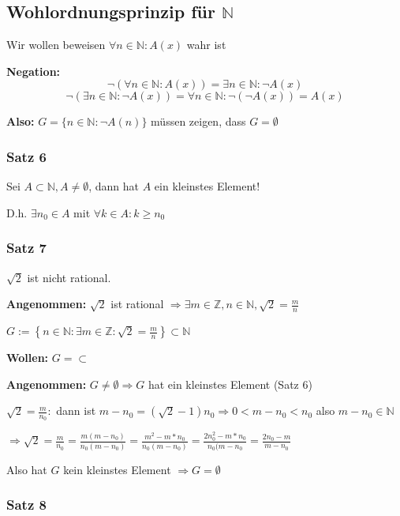 \documentclass[fleqn]{scrartcl}
\begin{document}
\subsection{Wohlordnungsprinzip für $\mathbb{N}$}

Wir wollen beweisen $\forall n \in \mathbb{N}: A(x)$ wahr ist

\textbf{Negation:}
\[\lnot(\forall n \in \mathbb{N}: A(x))=\exists n \in \mathbb{N}: \lnot A(x)\]
\[\lnot(\exists n \in \mathbb{N}: \lnot A(x))=\forall n \in \mathbb{N}: \lnot(\lnot A(x)) = A(x)\]

\textbf{Also:} $G=\{n\in \mathbb{N}: \lnot A(n)\}$ müssen zeigen, dass $G=\emptyset$

\subsubsection{Satz 6}

Sei $A \subset \mathbb{N}, A \neq \emptyset$, dann hat $A$ ein kleinstes Element!

D.h. $\exists n_0 \in A$ mit $\forall k \in A: k \geq n_0$

\subsubsection{Satz 7}

$\sqrt{2}$ ist nicht rational.

\textbf{Angenommen:} $\sqrt{2}$ ist rational $\Longrightarrow \exists m \in \mathbb{Z}, n \in \mathbb{N}, \sqrt{2}=\frac{m}{n}$

$G:=\left\{ n \in \mathbb{N}: \exists m \in \mathbb{Z}: \sqrt{2} = \frac{m}{n} \right\} \subset \mathbb{N}$

\textbf{Wollen:} $G=\subset$

\textbf{Angenommen:} $G \neq \emptyset \Longrightarrow G$ hat ein kleinstes Element (Satz 6)

$\sqrt{2}=\frac{m}{n_0}:$ dann ist $m-n_0 = (\sqrt{2}-1)n_0 \Longrightarrow 0<m-n_0<n_0$ also $m-n_0 \in \mathbb{N}$

$\Longrightarrow \sqrt{2} = \frac{m}{n_0} = \frac{m(m-n_0)}{n_0(m-n_0)} = \frac{m^2-m*n_0}{n_0(m-n_0)} = \frac{2n_0^2-m*n_0}{n_0(m-n_0} = \frac{2n_0-m}{m-n_0}$

Also hat $G$ kein kleinstes Element $\Longrightarrow G = \emptyset$ 

\subsubsection{Satz 8}
\end{document}
